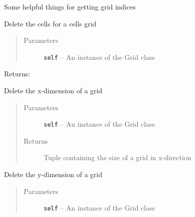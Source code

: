 \documentclass[letterpaper,10pt,english]{sphinxmanual}
\begin{document}
\begin{fulllineitems}
\begin{fulllineitems}
\end{fulllineitems}


\begin{fulllineitems}
\label{hyvr:hyvr.hyvr.grid.Grid.cs2}
Some helpful things for getting grid indices

\end{fulllineitems}


\begin{fulllineitems}
\label{hyvr:hyvr.hyvr.grid.Grid.del_cells}
Delete the cells for a cells grid
\begin{quote}\begin{description}
\item[{Parameters}] \leavevmode
\textbf{\texttt{self}} -- An instance of the Grid class

\end{description}\end{quote}

Returns:

\end{fulllineitems}


\begin{fulllineitems}
\label{hyvr:hyvr.hyvr.grid.Grid.del_lx}
Delete the x-dimension of a grid
\begin{quote}\begin{description}
\item[{Parameters}] \leavevmode
\textbf{\texttt{self}} -- An instance of the Grid class

\item[{Returns}] \leavevmode
Tuple containing the size of a grid in x-direction

\end{description}\end{quote}

\end{fulllineitems}


\begin{fulllineitems}
\label{hyvr:hyvr.hyvr.grid.Grid.del_ly}
Delete the y-dimension of a grid
\begin{quote}\begin{description}
\item[{Parameters}] \leavevmode
\textbf{\texttt{self}} -- An instance of the Grid class


\end{description}
\end{quote}
\end{fulllineitems}
\end{fulllineitems}
\end{document}
